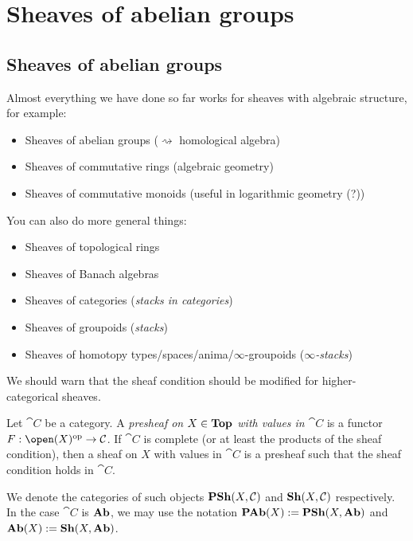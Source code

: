 \documentclass[../main.tex]{subfiles}
\begin{document}
\chapter{Sheaves of abelian groups}\label{lecture:6}

\section{Sheaves of abelian groups}
\noindent
Almost everything we have done so far works for sheaves with algebraic structure, for example:
\begin{itemize}
    \item Sheaves of abelian groups ($\rightsquigarrow$ homological algebra)
    \item Sheaves of commutative rings (algebraic geometry)
    \item Sheaves of commutative monoids (useful in logarithmic geometry (?))
\end{itemize}
You can also do more general things:
\begin{itemize}[resume]
    \item Sheaves of topological rings
    \item Sheaves of Banach algebras
    \item Sheaves of categories (\emph{stacks in categories})
    \item Sheaves of groupoids (\emph{stacks})
    \item Sheaves of homotopy types/spaces/anima/\(\infty\)-groupoids (\emph{$\infty$-stacks})
\end{itemize}
We should warn that the sheaf condition should be modified for higher-categorical sheaves.

\begin{defn}
    Let $\cat C$ be a category. A \emph{presheaf on $X\in\mathbf{Top}$ with values in $\cat C$} is a functor $F\colon \open(X)\opp \to \cat C$. If $\cat C$ is complete (or at least the products of the sheaf condition), then a sheaf on $X$ with values in $\cat C$ is a presheaf such that the sheaf condition holds in $\cat C$. 
    
    We denote the categories of such objects $\operatorname{\mathbf{PSh}}(X, \mathcal{C})$ and $\operatorname{\mathbf{Sh}}(X, \mathcal{C})$ respectively. In the case $\cat C$ is $\mathbf{Ab}$, we may use the notation $\operatorname{\mathbf{PAb}}(X) := \operatorname{\mathbf{PSh}}(X, \mathbf{Ab})$ and $\operatorname{\mathbf{Ab}}(X) := \operatorname{\mathbf{Sh}}(X, \mathbf{Ab})$.
\end{defn}
\end{document}
